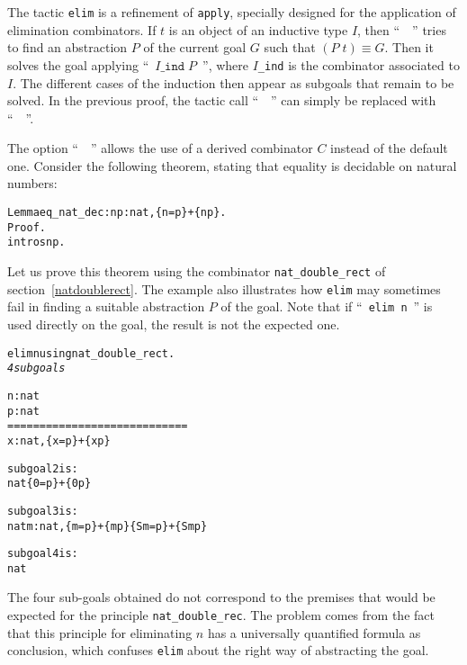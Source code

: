 \documentclass[11pt]{article}
\newcommand{\refmancite}[1]{{}}
\begin{document}
The tactic \texttt{elim} \refmancite{Section \ref{Elim}} is a
refinement of \texttt{apply}, specially designed for the application
of elimination combinators.  If $t$ is an object of an inductive type
$I$, then ``~~'' tries to find an abstraction $P$ of the
current goal $G$ such that $(P\;t)\equiv G$. Then it solves the goal
applying ``~$I\texttt{\_ind}\;P$~'', where $I$\texttt{\_ind} is the
combinator associated to $I$.  The different cases of the induction
then appear as subgoals that remain to be solved.
In the previous proof, the tactic call ``~~'' can simply be replaced with ``~~''.

The option ``~~''
 allows the use of a
derived combinator $C$ instead of the default one. Consider the
following theorem, stating that equality is decidable on natural
numbers:

\label{iseqpage}
\begin{alltt}
Lemma eq_nat_dec : {\prodsym} n p:nat, \{n=p\}+\{n {\coqdiff} p\}.
Proof.
 intros n p.
\end{alltt}

Let us prove this theorem using the combinator \texttt{nat\_double\_rect}
of section~\ref{natdoublerect}. The example also illustrates how
\texttt{elim} may sometimes fail in finding a suitable abstraction $P$
of the goal. Note that if ``~\texttt{elim n}~''
 is used directly on the
goal, the result is not the expected one.

\vspace{12pt}

\begin{alltt}
 elim n using nat_double_rect.
\it
4 subgoals
  
  n : nat
  p : nat
  ============================
   {\prodsym} x : nat, \{x = p\} + \{x {\coqdiff} p\}

subgoal 2 is:
 nat {\arrow} \{0 = p\} + \{0 {\coqdiff} p\}

subgoal 3 is:
 nat {\arrow} {\prodsym} m : nat, \{m = p\} + \{m {\coqdiff} p\} {\arrow} \{S m = p\} + \{S m {\coqdiff} p\}

subgoal 4 is:
 nat
\end{alltt}

The four sub-goals obtained do not correspond to the premises that
would be expected for the principle \texttt{nat\_double\_rec}. The
problem comes from the fact that 
this principle for eliminating $n$
has a universally quantified formula as conclusion, which confuses
\texttt{elim} about the right way of abstracting the goal. 
\end{document}
